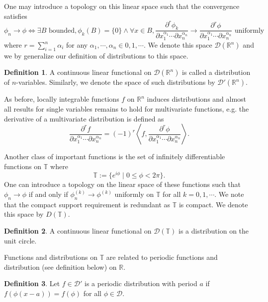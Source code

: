 \documentclass[]{article}
\theoremstyle{definition}
\theoremstyle{definition}
\newtheorem{definition}{Definition}[section]
\begin{document}
One may introduce a topology on this linear space such that the convergence 
satisfies 
\[\phi_n \to \phi \iff \exists B \text{ bounded}, \phi_k(B) = \{0\} \wedge \forall x \in B, 
  \frac{\partial^r \phi_k}{\partial x_1^{\alpha_1} \cdots \partial x_n^{\alpha_n}}
  \to 
  \frac{\partial^r \phi}{\partial x_1^{\alpha_1} \cdots \partial x_n^{\alpha_n}}
  \text{ uniformly}\]
where \(r = \sum_{i = 1}^n \alpha_i\) for any 
\(\alpha_1, \cdots, \alpha_n \in 0, 1, \cdots\). We denote this space 
\(\mathcal{D}(\mathbb{R}^n)\) and we by generalize our definition of distributions 
to this space.

\begin{definition}
  A continuous linear functional on \(\mathcal{D}(\mathbb{R}^n)\) is called a 
  distribution of \(n\)-variables. Similarly, we denote the space 
  of such distributions by \(\mathcal{D}'(\mathbb{R}^n)\).
\end{definition}

As before, locally integrable functions \(f\) on \(\mathbb{R}^n\) induces 
distributions and almost all results for single variables remains to hold for 
multivariate functions, e.g. the derivative of a multivariate distribution is 
defined as 
\[\frac{\partial^r f}{\partial x_1^{\alpha_1} \cdots \partial x_n^{\alpha_n}}
  = (-1)^r \left\langle f, 
  \frac{\partial^r \phi}{\partial x_1^{\alpha_1} \cdots \partial x_n^{\alpha_n}} \right\rangle.\]

Another class of important functions is the set of infinitely 
differentiable functions on \(\mathbb{T}\) where 
\[\mathbb{T} := \{e^{i\phi} \mid 0 \le \phi < 2\pi\}.\]
One can introduce a topology on the linear space of these functions such that 
\(\phi_n \to \phi\) if and only if \(\phi_n^{(k)} \to \phi^{(k)}\) uniformly 
on \(\mathbb{T}\) for all \(k = 0, 1, \cdots\). We note that the compact support 
requirement is redundant as \(\mathbb{T}\) is compact. We denote this space 
by \(D(\mathbb{T})\).

\begin{definition}
  A continuous linear functional on \(\mathcal{D}(\mathbb{T})\) is a distribution 
  on the unit circle. 
\end{definition}

Functions and distributions on \(\mathbb{T}\) are related to periodic functions 
and distribution (see definition below) on \(\mathbb{R}\). 

\begin{definition}
  Let \(f \in \mathcal{D}'\) is a periodic distribution with period \(a\) if 
  \(f(\phi(x - a)) = f(\phi)\) for all \(\phi \in \mathcal{D}\).
\end{definition}
\end{document}
